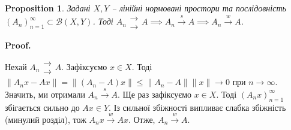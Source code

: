 \documentclass[a4paper, 10pt]{article}
\makeatletter
\theoremstyle{theoremdd}
\theoremstyle{theoremdd}
\theoremstyle{theoremdd}
\theoremstyle{theoremdd}
\theoremstyle{theoremdd}
\newtheorem{proposition}[theorem]{Proposition}
\theoremstyle{theoremdd}
\theoremstyle{theoremdd}
\theoremstyle{theoremdd}
\newcommand{\toweak}{\overset{w}{\to}}
\newcommand{\tostrong}{\overset{s}{\to}}
\renewenvironment{proof}[1][Proof.\\]{\par
\pushQED{\hfill \qed}%
\normalfont \topsep6\p@\@plus6\p@\relax
\trivlist
\item\relax
{\bfseries
#1\@addpunct{.}}\hspace\labelsep\ignorespaces
}{%
\popQED\endtrivlist\@endpefalse
}
\makeatother
\begin{document}
\begin{proposition}
Задані $X,Y$ -- лінійні нормовані простори та послідовність $(A_n)_{n=1}^\infty \subset \mathcal{B}(X,Y)$. Тоді $A_n \substack{\to \\ \to} A \implies A_n \tostrong A \implies A_n \toweak A$.
\end{proposition}

\begin{proof}
Нехай $A_n \substack{\to \\ \to} A$. Зафіксуємо $x \in X$. Тоді\\
$\| A_n x - Ax \| = \| (A_n-A) x\| \leq \|A_n - A\| \|x\| \to 0$ при $n \to \infty$.\\
Значить, ми отримали $A_n \tostrong A$. Ще раз зафіксуємо $x \in X$. Тоді $(A_n x)_{n=1}^\infty$ збігається сильно до $Ax \in Y$. Із сильної збіжності випливає слабка збіжність (минулий розділ), тож $A_n x\toweak A x$. Отже, $A_n \toweak A$.
\end{proof}
\end{document}
